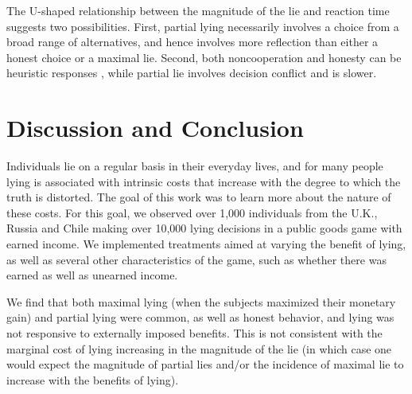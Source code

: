 \documentclass[12pt]{article}
\begin{document}

\par The U-shaped relationship between the magnitude of the lie and reaction time suggests two possibilities. First, partial lying necessarily involves a choice from a broad range of alternatives, and hence involves more reflection than either a honest choice or a maximal lie. Second, both noncooperation and honesty can be heuristic responses \citep{Randetal2014,Vershuere2014}, while partial lie involves decision conflict and is slower. 


\section*{Discussion and Conclusion}

\par Individuals lie on a regular basis in their everyday lives, and for many people lying is associated with intrinsic costs that increase with the degree to which the truth is distorted. The goal of this work was to learn more about the nature of these costs. For this goal, we observed over 1,000 individuals from the U.K., Russia and Chile making over 10,000 lying decisions in a public goods game with earned income. We implemented treatments aimed at varying the benefit of lying, as well as several other characteristics of the game, such as whether there was earned as well as unearned income. 

\par We find that both maximal lying (when the subjects maximized their monetary gain) and partial lying were common, as well as honest behavior, and lying was not responsive to externally imposed benefits. This is not consistent with the marginal cost of lying increasing in the magnitude of the lie (in which case one would expect the magnitude of partial lies and/or the incidence of maximal lie to increase with the benefits of lying). 
\end{document}
